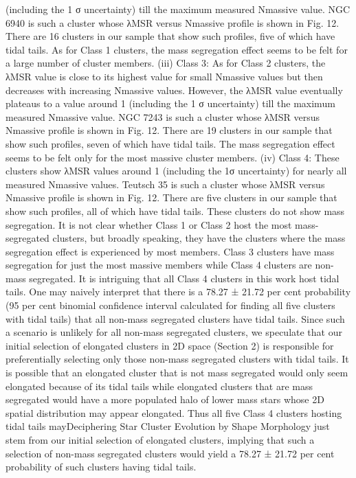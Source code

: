 \documentclass[../main.tex]{subfiles}
\begin{document}
{(including the 1 σ uncertainty) till the maximum measured Nmassive
value. NGC 6940 is such a cluster whose λMSR versus Nmassive profile
is shown in Fig. 12. There are 16 clusters in our sample that show
such profiles, five of which have tidal tails. As for Class 1 clusters,
the mass segregation effect seems to be felt for a large number of
cluster members.
(iii) Class 3: As for Class 2 clusters, the λMSR value is close
to its highest value for small Nmassive values but then decreases
with increasing Nmassive values. However, the λMSR value eventually
plateaus to a value around 1 (including the 1 σ uncertainty) till
the maximum measured Nmassive value. NGC 7243 is such a cluster
whose λMSR versus Nmassive profile is shown in Fig. 12. There are 19
clusters in our sample that show such profiles, seven of which have
tidal tails. The mass segregation effect seems to be felt only for the
most massive cluster members.
(iv) Class 4: These clusters show λMSR values around 1 (including
the 1σ uncertainty) for nearly all measured Nmassive values.
Teutsch 35 is such a cluster whose λMSR versus Nmassive profile is
shown in Fig. 12. There are five clusters in our sample that show
such profiles, all of which have tidal tails. These clusters do not
show mass segregation.
It is not clear whether Class 1 or Class 2 host the most mass-
segregated clusters, but broadly speaking, they have the clusters
where the mass segregation effect is experienced by most members.
Class 3 clusters have mass segregation for just the most massive
members while Class 4 clusters are non-mass segregated. It is
intriguing that all Class 4 clusters in this work host tidal tails.
One may naively interpret that there is a 78.27 ± 21.72 per cent
probability (95 per cent binomial confidence interval calculated for
finding all five clusters with tidal tails) that all non-mass segregated
clusters have tidal tails. Since such a scenario is unlikely for all
non-mass segregated clusters, we speculate that our initial selection
of elongated clusters in 2D space (Section 2) is responsible for
preferentially selecting only those non-mass segregated clusters with
tidal tails. It is possible that an elongated cluster that is not mass
segregated would only seem elongated because of its tidal tails
while elongated clusters that are mass segregated would have a more
populated halo of lower mass stars whose 2D spatial distribution may
appear elongated. Thus all five Class 4 clusters hosting tidal tails mayDeciphering Star Cluster Evolution by Shape Morphology
just stem from our initial selection of elongated clusters, implying
that such a selection of non-mass segregated clusters would yield a
78.27 ± 21.72 per cent probability of such clusters having tidal tails.

}
\end{document}
